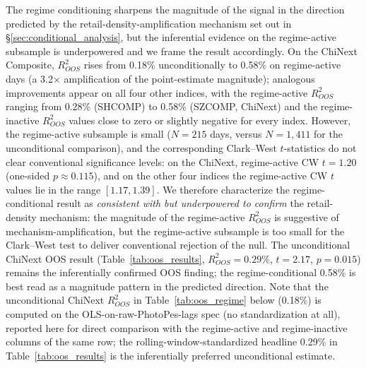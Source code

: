 \documentclass[AER]{AEA}
\begin{document}
The regime conditioning sharpens the magnitude of the signal in the direction predicted by the retail-density-amplification mechanism set out in \S\ref{sec:conditional_analysis}, but the inferential evidence on the regime-active subsample is underpowered and we frame the result accordingly. On the ChiNext Composite, $R^2_{OOS}$ rises from 0.18\% unconditionally to 0.58\% on regime-active days (a 3.2$\times$ amplification of the point-estimate magnitude); analogous improvements appear on all four other indices, with the regime-active $R^2_{OOS}$ ranging from 0.28\% (SHCOMP) to 0.58\% (SZCOMP, ChiNext) and the regime-inactive $R^2_{OOS}$ values close to zero or slightly negative for every index. However, the regime-active subsample is small ($N=215$ days, versus $N=1{,}411$ for the unconditional comparison), and the corresponding Clark--West $t$-statistics do not clear conventional significance levels: on the ChiNext, regime-active CW $t = 1.20$ (one-sided $p \approx 0.115$), and on the other four indices the regime-active CW $t$ values lie in the range $[1.17, 1.39]$. We therefore characterize the regime-conditional result as \emph{consistent with but underpowered to confirm} the retail-density mechanism: the magnitude of the regime-active $R^2_{OOS}$ is suggestive of mechanism-amplification, but the regime-active subsample is too small for the Clark--West test to deliver conventional rejection of the null. The unconditional ChiNext OOS result (Table~\ref{tab:oos_results}, $R^2_{OOS}=0.29\%$, $t=2.17$, $p=0.015$) remains the inferentially confirmed OOS finding; the regime-conditional 0.58\% is best read as a magnitude pattern in the predicted direction. Note that the unconditional ChiNext $R^2_{OOS}$ in Table~\ref{tab:oos_regime} below (0.18\%) is computed on the OLS-on-raw-PhotoPes-lags spec (no standardization at all), reported here for direct comparison with the regime-active and regime-inactive columns of the same row; the rolling-window-standardized headline 0.29\% in Table~\ref{tab:oos_results} is the inferentially preferred unconditional estimate.
\end{document}

